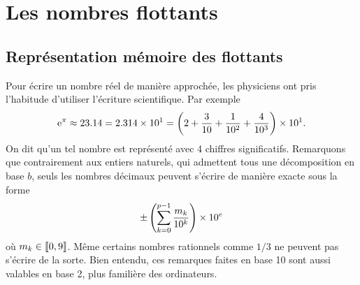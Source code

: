 \documentclass{magnolia}
\begin{document}








\section{Les nombres flottants}



\subsection{Représentation mémoire des flottants}

Pour écrire un nombre réel de manière approchée, les physiciens ont pris l'habitude
d'utiliser l'écriture scientifique. Par exemple
\[{\rm e}^{\pi}\approx 23.14 = 2.314 \times 10^1 =\left(2+\frac{3}{10}+\frac{1}{10^2}+\frac{4}{10^3}\right)\times 10^1.\]
On dit qu'un tel nombre est représenté avec 4 chiffres significatifs. Remarquons que
contrairement aux entiers naturels, qui admettent tous une décomposition en base $b$,
seuls les nombres décimaux peuvent s'écrire de manière exacte sous la forme
\[\pm\left(\sum_{k=0}^{p-1} \frac{m_k}{10^k}\right)\times 10^e\]
où $m_k\in\left\llbracket 0,9\right\rrbracket$. Même certains nombres rationnels comme $1/3$ ne peuvent
pas s'écrire de la sorte. Bien entendu, ces remarques faites en base 10 sont aussi
valables en base 2, plus familière des ordinateurs.
\end{document}
